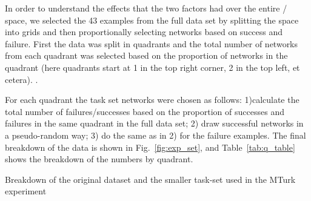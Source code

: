 In order to understand the effects that the two \famsec{} factors had over the entire \xQ{}/\xO{} space, we selected the 43 examples from the full data set by splitting the space into grids and then proportionally selecting networks based on success and failure. First the data was split in quadrants and the total number of networks from each quadrant was selected based on the proportion of networks in the quadrant (here quadrants start at 1 in the top right corner, 2 in the top left, et cetera). .

For each quadrant the task set networks were chosen as follows: 1)calculate the total number of failures/successes based on the proportion of successes and failures in the same quadrant in the full data set; 2) draw successful networks in a pseudo-random way; 3) do the same as in 2) for the failure examples. The final breakdown of the data is shown in Fig.~\ref{fig:exp_set}, and Table~\ref{tab:q_table} shows the breakdown of the numbers by quadrant.

\begin{table}
    \centering
    \caption{Breakdown of the original dataset and the smaller task-set used in the MTurk experiment}
    \label{tab:q_table}
    
\end{table}
